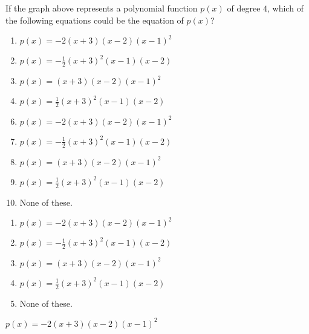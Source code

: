  \begin{center}
\end{center}
If the graph above represents a polynomial function $p(x)$ of degree $4$, which of the following equations could be the equation of $p(x)$?


\ifsat
	\begin{enumerate}[label=\Alph*)]
		\item $p(x)=-2(x+3)(x-2)(x-1)^2 $ %
		\item $p(x)=-\frac{1}{2}(x+3)^2(x-1)(x-2) $ 
		\item $p(x)=(x+3)(x-2)(x-1)^2 $ 
		\item $p(x)=\frac{1}{2}(x+3)^2(x-1)(x-2) $
	\end{enumerate}
\else
\fi

\ifacteven
	\begin{enumerate}[label=\textbf{\Alph*.},itemsep=\fill,align=left]
		\setcounter{enumii}{5}
		\item $p(x)=-2(x+3)(x-2)(x-1)^2 $ %
		\item $p(x)=-\frac{1}{2}(x+3)^2(x-1)(x-2) $ 
		\item $p(x)=(x+3)(x-2)(x-1)^2 $ 
		\addtocounter{enumii}{1}
		\item $p(x)=\frac{1}{2}(x+3)^2(x-1)(x-2) $
		\item None of these. 
	\end{enumerate}
\else
\fi

\ifactodd
	\begin{enumerate}[label=\textbf{\Alph*.},itemsep=\fill,align=left]
		\item $p(x)=-2(x+3)(x-2)(x-1)^2 $ %
		\item $p(x)=-\frac{1}{2}(x+3)^2(x-1)(x-2) $ 
		\item $p(x)=(x+3)(x-2)(x-1)^2 $ 
		\item $p(x)=\frac{1}{2}(x+3)^2(x-1)(x-2) $
		\item None of these. 
	\end{enumerate}
\else
\fi

\ifgridin
 $p(x)=-2(x+3)(x-2)(x-1)^2 $ %
		
\else
\fi

